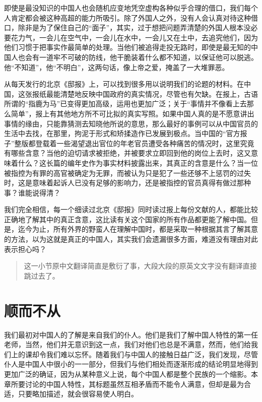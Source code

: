 \documentclass[12pt,oneside]{book}
\begin{document}
\begin{common-format}
即使是最没知识的中国人也会随机应变地凭空虚构各种似乎合理的借口，我们每个人肯定都会被这种高超的能力所吸引。除了外国人之外，没有人会认真对待这种借口，除非是为了保住自己的“面子”，其实，过于想把问题弄清楚的外国人根本没必要花力气，一会儿在空气中，一会儿在水中，一会儿又在土中，去追究他们，因为他们习惯于把事实作最简单的处理。当他们被追得走投无路时，即使是最无知的中国人也会有一道牢不可破的防线，他干脆装着什么都不知道，以保证他可以脱逃。他“不知道”，他“不明白”，这两句话，像上帝之爱，掩盖了一大堆罪恶。 

从每天发行的北京《邸报》上，可以找到很多用以说明我们的论题的材料。在中国，这张报纸最能清楚地反映中国政府的真实情况，尽管也有欠缺。在报上，古语所谓的“指鹿为马”已变得更加高级，运用也更加广泛；关于“事情并不像看上去那么简单”，报上有其他地方所不可比拟的真实写照。如果中国人真的是不愿意讲出事情的缘由，只能靠猜测去知晓他所说的意思，那么最好的事例可以从中国官员的生活中去找，在那里，拘泥于形式和矫揉造作已发展到极点。当中国的“官方报子”整版都登载着一些渴望退出官位的年老官员遭受各种痛苦的情况时，这里究竟有哪些含意？当他的迫切请求被拒绝，并被要求立即回到他的岗位上去时，这又意味着什么？这长篇的编年史作为事实材料披露出来，其真正的含意是什么？当一位被指控为有罪的高官被确定为无罪，而被认为只是犯了一些还够不上惩罚的过失时，这是意味着起诉人已没有足够的影响力，还是被指控的官员真得有做过那种事？谁能说得清？ 

我们完全相信，每一个细读过北京《邸报》同时读过报上每份文献的人，都能比较正确地了解其中的真正含意，这比读有关这个国家的所有作品都更能了解中国。但是，迄今为止，所有外界的野蛮人在理解中国时，都是采取一种根据其言了解其意的方法，以为这就是真正的中国人，其实我们会遗漏很多方面，难道没有理由对此表示担心吗？ 

\begin{quotation}
这一小节原中文翻译简直是敷衍了事，大段大段的原英文文字没有翻译直接跳过去了。


\end{quotation}

\chapter{顺而不从}
我们最初对中国人的了解是来自我们的仆人。他们是我们了解中国人特性的第一任老师，当然，他们并无意识到这一点，我们对他们也总是不满意，然而，他们给我们上的课却令我们难以忘怀。随着我们与中国人的接触日益广泛，我们发现，尽管仆人是中国人中很小的一一部分，但我们与他们相处而逐渐形成的结论明显地得到更加广泛的确证，因为从某种意义上说，每个中国人都是整个民族的一个缩影。本章所要讨论的中国人特性，其标题虽然互相矛盾而不能令人满意，但却是最为合适，只要略加描述，就会很容易使人明白。 


\end{common-format}
\end{document}
